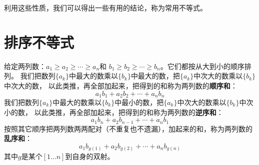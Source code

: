 \documentclass[12pt,UTF8]{ctexbook}
\begin{document}
利用这些性质，我们可以得出一些有用的结论，称为常用不等式。

\section{排序不等式}

给定两列数：$a_1 \geqslant a_2 \geqslant \cdots \geqslant a_n$和
$b_1 \geqslant b_2 \geqslant \cdots \geqslant b_n$。它们都按从大到小的顺序排列。
我们把数列$\{a_k\}$中最大的数乘以$\{b_k\}$中最大的数，把$\{a_k\}$中次大的数乘以$\{b_k\}$中次大的数，
以此类推，再全部加起来，把得到的和称为两列数的\textbf{顺序和}：
$$ a_1b_1 + a_2b_2 + \cdots + a_nb_n $$
我们把数列$\{a_k\}$中最大的数乘以$\{b_k\}$中最小的数，把$\{a_k\}$中次大的数乘以$\{b_k\}$中次小的数，
以此类推，再全部加起来，把得到的和称为两列数的\textbf{逆序和}：
$$ a_1b_n + a_2b_{n-1} + \cdots + a_nb_1 $$
按照其它顺序把两列数两两配对（不重复也不遗漏），加起来的和，称为两列数的\textbf{乱序和}：
$$ a_1b_{g(1)} + a_2b_{g(2)} + \cdots + a_nb_{g(n)} $$
其中$g$是某个$[1\dots n]$到自身的双射。
\end{document}

